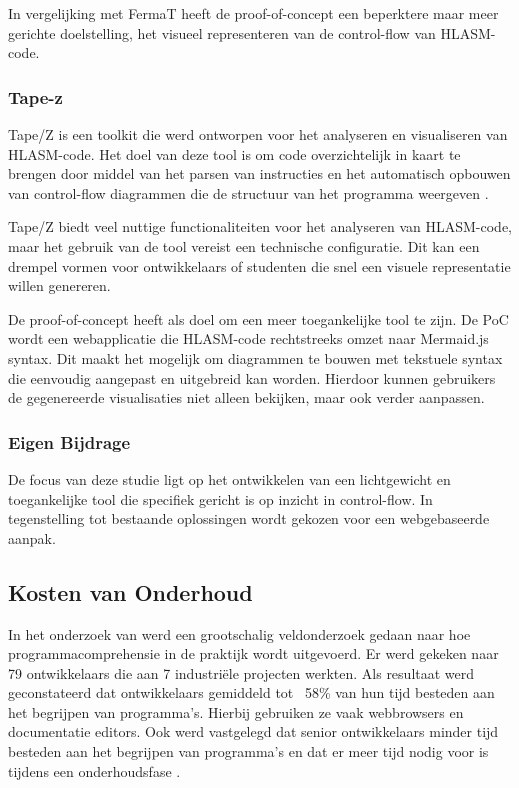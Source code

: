 In vergelijking met FermaT heeft de proof-of-concept een beperktere maar meer gerichte doelstelling, het visueel representeren van de control-flow van HLASM-code.

\newpage

\subsubsection{Tape-z}

Tape/Z is een toolkit die werd ontworpen voor het analyseren en visualiseren van HLASM-code. Het doel van deze tool is om code overzichtelijk in kaart te brengen door middel van het parsen van instructies en het automatisch opbouwen van control-flow diagrammen die de structuur van het programma weergeven \autocite{gupta_2025}.

Tape/Z biedt veel nuttige functionaliteiten voor het analyseren van HLASM-code, maar het gebruik van de tool vereist een technische configuratie. Dit kan een drempel vormen voor ontwikkelaars of studenten die snel een visuele representatie willen genereren.

De proof-of-concept heeft als doel om een meer toegankelijke tool te zijn. De PoC wordt een webapplicatie die HLASM-code rechtstreeks omzet naar Mermaid.js syntax. Dit maakt het mogelijk om diagrammen te bouwen met tekstuele syntax die eenvoudig aangepast en uitgebreid kan worden. Hierdoor kunnen gebruikers de gegenereerde visualisaties niet alleen bekijken, maar ook verder aanpassen.



\subsubsection{Eigen Bijdrage}

De focus van deze studie ligt op het ontwikkelen van een lichtgewicht en toegankelijke tool die specifiek gericht is op inzicht in control-flow. In tegenstelling tot bestaande oplossingen wordt gekozen voor een webgebaseerde aanpak. 


\subsection{Kosten van Onderhoud}


In het onderzoek van \textcite{xia_bao_lo_xing_hassan_li_2018} werd een grootschalig veldonderzoek gedaan naar hoe programmacomprehensie in de praktijk wordt uitgevoerd. Er werd gekeken naar 79 ontwikkelaars die aan 7 industriële projecten werkten. Als resultaat werd geconstateerd dat ontwikkelaars gemiddeld tot ~58\% van hun tijd besteden aan het begrijpen van programma's. Hierbij gebruiken ze vaak webbrowsers en documentatie editors. Ook werd vastgelegd dat senior ontwikkelaars minder tijd besteden aan het begrijpen van programma's en dat er meer tijd nodig voor is tijdens een onderhoudsfase \autocite{xia_bao_lo_xing_hassan_li_2018}. 

